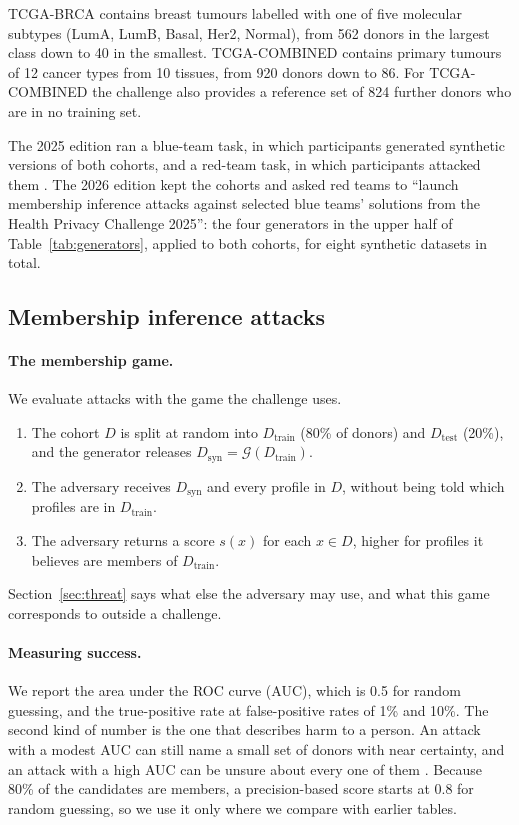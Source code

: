 \documentclass[webpdf,contemporary,large]{oup-authoring-template}
\newcommand{\Dtrain}{D_{\mathrm{train}}}
\newcommand{\Dtest}{D_{\mathrm{test}}}
\newcommand{\Dsyn}{D_{\mathrm{syn}}}
\begin{document}
TCGA-BRCA contains breast tumours labelled with one of five molecular subtypes (LumA, LumB, Basal, Her2, Normal), from 562 donors in the largest class down to 40 in the smallest. TCGA-COMBINED contains primary tumours of 12 cancer types from 10 tissues, from 920 donors down to 86. For TCGA-COMBINED the challenge also provides a reference set of 824 further donors who are in no training set.

The 2025 edition ran a blue-team task, in which participants generated synthetic versions of both cohorts, and a red-team task, in which participants attacked them \citep{ozturk2026towards}. The 2026 edition kept the cohorts and asked red teams to ``launch membership inference attacks against selected blue teams' solutions from the Health Privacy Challenge 2025'': the four generators in the upper half of Table~\ref{tab:generators}, applied to both cohorts, for eight synthetic datasets in total.

\subsection{Membership inference attacks}
\label{sec:mia}

\paragraph{The membership game.}
We evaluate attacks with the game the challenge uses.
\begin{enumerate}
  \item The cohort $D$ is split at random into $\Dtrain$ (80\% of donors) and $\Dtest$ (20\%), and the generator releases $\Dsyn = \mathcal{G}(\Dtrain)$.
  \item The adversary receives $\Dsyn$ and every profile in $D$, without being told which profiles are in $\Dtrain$.
  \item The adversary returns a score $s(x)$ for each $x \in D$, higher for profiles it believes are members of $\Dtrain$.
\end{enumerate}
Section~\ref{sec:threat} says what else the adversary may use, and what this game corresponds to outside a challenge.

\paragraph{Measuring success.}
We report the area under the ROC curve (AUC), which is 0.5 for random guessing, and the true-positive rate at false-positive rates of 1\% and 10\%. The second kind of number is the one that describes harm to a person. An attack with a modest AUC can still name a small set of donors with near certainty, and an attack with a high AUC can be unsure about every one of them \citep{carlini2022membership}. Because 80\% of the candidates are members, a precision-based score starts at 0.8 for random guessing, so we use it only where we compare with earlier tables.
\end{document}
